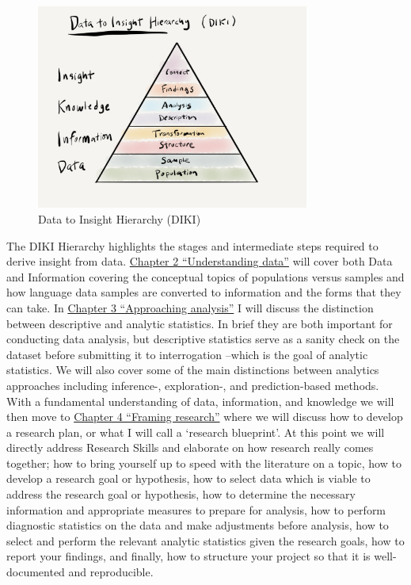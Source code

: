 \documentclass[
  letterpaper,
]{scrbook}
\begin{document}
\begin{figure}[h]

{\centering \includegraphics[width=0.8\textwidth,height=\textheight]{./figures/text-analysis/diki-hierarchy-paper.png}

}

\caption{\label{fig-diki-hierarchy}Data to Insight Hierarchy (DIKI)}

\end{figure}

The DIKI Hierarchy highlights the stages and intermediate steps required
to derive insight from data.
\protect\hyperlink{sec-understanding-data}{Chapter 2 ``Understanding
data''} will cover both Data and Information covering the conceptual
topics of populations versus samples and how language data samples are
converted to information and the forms that they can take. In
\protect\hyperlink{sec-approaching-analysis}{Chapter 3 ``Approaching
analysis''} I will discuss the distinction between descriptive and
analytic statistics. In brief they are both important for conducting
data analysis, but descriptive statistics serve as a sanity check on the
dataset before submitting it to interrogation --which is the goal of
analytic statistics. We will also cover some of the main distinctions
between analytics approaches including inference-, exploration-, and
prediction-based methods. With a fundamental understanding of data,
information, and knowledge we will then move to
\protect\hyperlink{sec-framing-research}{Chapter 4 ``Framing research''}
where we will discuss how to develop a research plan, or what I will
call a `research blueprint'. At this point we will directly address
Research Skills and elaborate on how research really comes together; how
to bring yourself up to speed with the literature on a topic, how to
develop a research goal or hypothesis, how to select data which is
viable to address the research goal or hypothesis, how to determine the
necessary information and appropriate measures to prepare for analysis,
how to perform diagnostic statistics on the data and make adjustments
before analysis, how to select and perform the relevant analytic
statistics given the research goals, how to report your findings, and
finally, how to structure your project so that it is well-documented and
reproducible.
\end{document}
